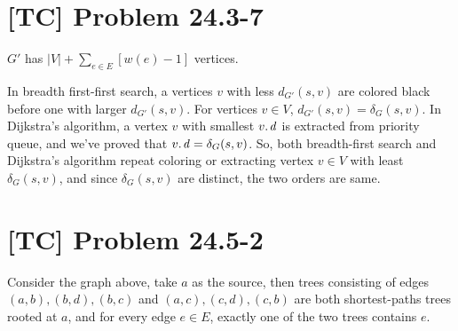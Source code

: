 \documentclass[a4paper,11pt,twocolumn]{article}
\begin{document}
  \section{[TC] Problem 24.3-7}
  $G'$ has $|V| + \sum_{e \in E} [w(e)-1]$ vertices. \par
  In breadth first-first search, a vertices $v$ with less $d_{G'}(s, v)$ are colored black before one with larger $d_{G'}(s, v)$. For vertices $v \in V$, $d_{G'}(s, v) = \delta_G(s, v)$. In Dijkstra's algorithm, a vertex $v$ with smallest $\attrib{v}{d}$ is extracted from priority queue, and we've proved that $\attrib{v}{d} = \delta_{G}(s, v)$. So, both breadth-first search and Dijkstra's algorithm repeat coloring or extracting vertex $v \in V$ with least $\delta_{G}(s, v)$, and since $\delta_{G}(s, v)$ are distinct, the two orders are same.

  \section{[TC] Problem 24.5-2}
  \small
  \begin{center}
   \par
  \end{center}
  \normalsize
  Consider the graph above, take $a$ as the source, then trees consisting of edges $(a, b), (b, d), (b, c)$ and $(a, c), (c, d), (c, b)$ are both shortest-paths trees rooted at $a$, and for every edge $e \in E$, exactly one of the two trees contains $e$.
\end{document}
